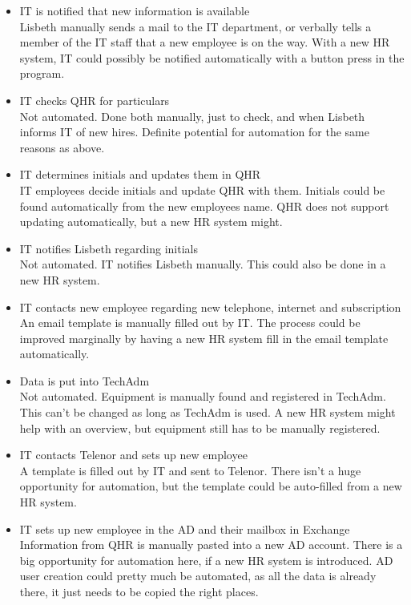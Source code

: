 \begin{itemize}
	\item{IT is notified that new information is available}\\
		Lisbeth manually sends a mail to the IT department, or verbally tells a member of the IT staff that a new employee is on the way.
		With a new HR system, IT could possibly be notified automatically with a button press in the program.		
	
	\item{IT checks QHR for particulars}\\
		Not automated. Done both manually, just to check, and when Lisbeth informs IT of new hires.
		Definite potential for automation for the same reasons as above.
	
	\item{IT determines initials and updates them in QHR}\\
		IT employees decide initials and update QHR with them. Initials could be found automatically from the new employees name. QHR does not support updating automatically, but a new HR system might.
	
	\item{IT notifies Lisbeth regarding initials}\\
		Not automated. IT notifies Lisbeth manually. This could also be done in a new HR system.
	
	\item{IT contacts new employee regarding new telephone, internet and subscription}\\
		An email template is manually filled out by IT. The process could be improved marginally by having a new HR system fill in the email template automatically.
	
	\item{Data is put into TechAdm}\\
		Not automated. Equipment is manually found and registered in TechAdm.
		This can't be changed as long as TechAdm is used. A new HR system might help with an overview, but equipment still has to be manually registered.
	
	\item{IT contacts Telenor and sets up new employee}\\
		A template is filled out by IT and sent to Telenor. There isn't a huge opportunity for automation, but the template could be auto-filled from a new HR system.
	
	\item{IT sets up new employee in the AD and their mailbox in Exchange}\\
		Information from QHR is manually pasted into a new AD account. There is a big opportunity for automation here, if a new HR system is introduced. AD user creation could pretty much be automated, as all the data is already there, it just needs to be copied the right places.
	

\end{itemize}
